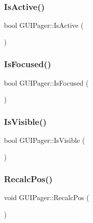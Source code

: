 \subsubsection{\texorpdfstring{Is\+Active()}{IsActive()}}
{\footnotesize\ttfamily bool G\+U\+I\+Pager\+::\+Is\+Active (\begin{DoxyParamCaption}{ }\end{DoxyParamCaption})}

\hypertarget{class_g_u_i_pager_a013bffb553bec18947ce45b8ff63417a}{}\label{class_g_u_i_pager_a013bffb553bec18947ce45b8ff63417a} 
\subsubsection{\texorpdfstring{Is\+Focused()}{IsFocused()}}
{\footnotesize\ttfamily bool G\+U\+I\+Pager\+::\+Is\+Focused (\begin{DoxyParamCaption}{ }\end{DoxyParamCaption})}

\hypertarget{class_g_u_i_pager_a21109d07d268cc890d8afdac5c8908c0}{}\label{class_g_u_i_pager_a21109d07d268cc890d8afdac5c8908c0} 
\subsubsection{\texorpdfstring{Is\+Visible()}{IsVisible()}}
{\footnotesize\ttfamily bool G\+U\+I\+Pager\+::\+Is\+Visible (\begin{DoxyParamCaption}{ }\end{DoxyParamCaption})}

\hypertarget{class_g_u_i_pager_ae79f7e2081875e4a27c8993875c4094a}{}\label{class_g_u_i_pager_ae79f7e2081875e4a27c8993875c4094a} 
\subsubsection{\texorpdfstring{Recalc\+Pos()}{RecalcPos()}}
{\footnotesize\ttfamily void G\+U\+I\+Pager\+::\+Recalc\+Pos (\begin{DoxyParamCaption}{ }\end{DoxyParamCaption})}

\hypertarget{class_g_u_i_pager_a53cae616d4a02b2fa8644f63388ed3d6}{}\label{class_g_u_i_pager_a53cae616d4a02b2fa8644f63388ed3d6} 
